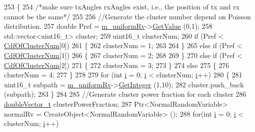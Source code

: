 \begin{DoxyCode}
253         \{
254                 \textcolor{comment}{/*make sure txAngles rxAngles exist, i.e., the position of tx and rx cannot be the same*/}
255 
256                 \textcolor{comment}{//Generate the cluster number depend on Poisson distribution.}
257                 \textcolor{keywordtype}{double} Pref = \hyperlink{classns3_1_1MmWaveChannelMatrix_a914afe40a958ddccd64a99f86190be0c}{m\_uniformRv}->\hyperlink{classns3_1_1UniformRandomVariable_a03822d8c86ac51e9aa83bbc73041386b}{GetValue} (0,1);
258                 std::vector<uint16\_t> cluster;
259                 uint16\_t clusterNum;
260                 \textcolor{keywordflow}{if} (Pref < \hyperlink{namespacens3_a0eb7871a74ed84d4c17051cf7a9d62a9}{CdfOfClusterNum}[0])
261                 \{
262                         clusterNum = 1;
263 
264                 \}
265                 \textcolor{keywordflow}{else} \textcolor{keywordflow}{if} (Pref < \hyperlink{namespacens3_a0eb7871a74ed84d4c17051cf7a9d62a9}{CdfOfClusterNum}[1])
266                 \{
267                         clusterNum = 2;
268 
269                 \}
270                 \textcolor{keywordflow}{else} \textcolor{keywordflow}{if} (Pref < \hyperlink{namespacens3_a0eb7871a74ed84d4c17051cf7a9d62a9}{CdfOfClusterNum}[2])
271                 \{
272                         clusterNum = 3;
273                 \}
274                 \textcolor{keywordflow}{else}
275                 \{
276                         clusterNum = 4;
277                 \}
278 
279                 \textcolor{keywordflow}{for} (\textcolor{keywordtype}{int} \hyperlink{bernuolliDistribution_8m_a6f6ccfcf58b31cb6412107d9d5281426}{i} = 0; \hyperlink{bernuolliDistribution_8m_a6f6ccfcf58b31cb6412107d9d5281426}{i} < clusterNum; \hyperlink{bernuolliDistribution_8m_a6f6ccfcf58b31cb6412107d9d5281426}{i}++)
280                 \{
281                         uint16\_t subpath = \hyperlink{classns3_1_1MmWaveChannelMatrix_a914afe40a958ddccd64a99f86190be0c}{m\_uniformRv}->\hyperlink{classns3_1_1RandomVariableStream_a66cd94e6305ce7f000f1a9ff0fcb9aef}{GetInteger} (1,10);
282                         cluster.push\_back (subpath);
283                 \}
284 
285                 \textcolor{comment}{//Generate cluster power fraction for each cluster}
286                 \hyperlink{namespacens3_aa6f1edf6566ca6afec613bc6e40240ea}{doubleVector\_t} clusterPowerFraction;
287                 Ptr<NormalRandomVariable> normalRv = CreateObject<NormalRandomVariable> ();
288                 \textcolor{keywordflow}{for}(\textcolor{keywordtype}{int} \hyperlink{bernuolliDistribution_8m_a6f6ccfcf58b31cb6412107d9d5281426}{i} = 0; \hyperlink{bernuolliDistribution_8m_a6f6ccfcf58b31cb6412107d9d5281426}{i} < clusterNum; \hyperlink{bernuolliDistribution_8m_a6f6ccfcf58b31cb6412107d9d5281426}{i}++)

\end{DoxyCode}
